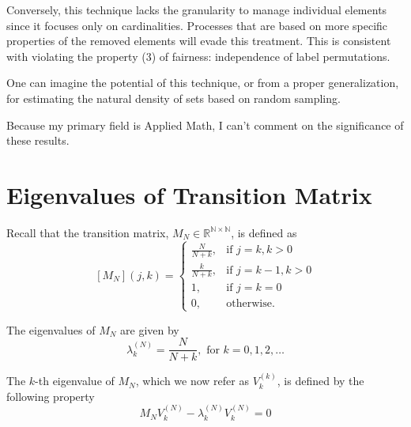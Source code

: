 \documentclass{article}
\newcommand{\N}{\mathbb{N}}
\newcommand{\R}{\mathbb{R}}
\newcommand{\spar}[1]{\left[ #1 \right]}
\begin{document}
Conversely, this technique lacks the granularity to manage individual elements since it focuses only on cardinalities. 
%
Processes that are based on more specific properties of the removed elements will evade this treatment.
%
This is consistent with violating the property (3) of fairness: independence of label permutations.

One can imagine the potential of this technique, or from a proper generalization, for estimating the natural density of sets based on random sampling.

Because my primary field is Applied Math, I can't comment on the significance of these results. 




\newpage

\appendix 

\section{Eigenvalues of Transition Matrix}
\label{ap:eigenvalues}

Recall that the transition matrix, $M_N\in \R^{\N\times \N}$, is defined as
\begin{equation}
    \spar{M_N}(j,k) = 
    \begin{cases}
        \frac{N}{N+k}, &\text{if } j= k, k>0 \\
        \frac{k}{N+k}, &\text{if } j= k-1, k>0 \\
        1, &\text{if } j= k=0 \\
        0, &\text{otherwise.}
    \end{cases}
\end{equation}

The eigenvalues of $M_N$ are given by
\begin{equation}
    \lambda^{(N)}_k = \frac{N}{N+k}, \text{ for } k=0,1, 2, \dots
\end{equation}

The $k$-th eigenvalue of $M_N$, which we now refer as $V_k^{(k)}$, is defined by the following property
\begin{equation}
    M_N V_k^{(N)} - \lambda^{(N)}_k V_k^{(N)} = 0
    \label{a:01}
\end{equation}
\end{document}
